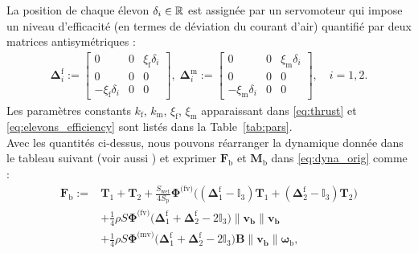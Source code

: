 La position de chaque élevon $\delta_i \in {\mathbb R}$ est assignée par un servomoteur qui impose un niveau d'efficacité (en termes de déviation du courant d'air) quantifié par deux matrices antisymétriques :
\begin{align}
\label{eq:elevons_efficiency}
    \boldsymbol{\Delta}^{\text{f}}_{i} \!:=\! \begin{bmatrix} 0 & 0 & \xi_{\text{f}}\delta_{i} \\ 0 & 0 & 0 \\ -\xi_{\text{f}}\delta_{i} & 0 & 0 \end{bmatrix}\! ,\;
    \boldsymbol{\Delta}^{\text{m}}_{i} \!:=\! \begin{bmatrix} 0 & 0 & \xi_{\text{m}}\delta_{i} \\ 0 & 0 & 0 \\ -\xi_{\text{m}}\delta_{i} & 0 & 0 \end{bmatrix} \!, \quad i=1,2.
\end{align}
 Les paramètres constants $k_{\text{f}}$, $k_{\text{m}}$, $\xi_{\text{f}}$, $\xi_{\text{m}}$ apparaissant dans \eqref{eq:thrust} et \eqref{eq:elevons_efficiency} sont listés dans la Table~\ref{tab:pars}.\\
Avec les quantités ci-dessus, nous pouvons réarranger la dynamique donnée dans le tableau suivant \cite[eqns (97),~(98)]{lustosaHal-03035938} (voir aussi \cite{sansouStage}) et exprimer $\boldsymbol{F}_{\text{b}}$ et $\boldsymbol{M}_{\text{b}}$ dans \eqref{eq:dyna_orig} comme :
%
\begin{align}
\nonumber
    \boldsymbol{F}_{\text{b}} :={}&  \boldsymbol{T}_{1} + \boldsymbol{T}_{2} + \frac{S_{\text{wet}}}{4S_{\text{p}}} \boldsymbol{\Phi}^{\text{(fv)}} \Big( (\boldsymbol{\Delta}^{\text{f}}_1 - \mathbb{I}_{3} ) \boldsymbol{T}_{1} + ( \boldsymbol{\Delta}^{\text{f}}_2 - \mathbb{I}_{3}) \boldsymbol{T}_{2}\Big) \\ 
     \label{eq:Fb}
    &+ \frac{1}{4} \rho S  \boldsymbol{\Phi}^{\text{(fv)}} \Big(\boldsymbol{\Delta}^{\text{f}}_1+ \boldsymbol{\Delta}^{\text{f}}_2 - 2 \mathbb{I}_{3} \Big) \lVert \boldsymbol{v_{\text{b}}} \rVert \boldsymbol{v_{\text{b}}}\\
    \nonumber
    &+ \frac{1}{4} \rho S \boldsymbol{\Phi}^{\text{(mv)}} \Big(\boldsymbol{\Delta}^{\text{f}}_1 + \boldsymbol{\Delta}^{\text{f}}_2 - 2\mathbb{I}_{3}\Big) \boldsymbol{B} \lVert \boldsymbol{v_{\text{b}}} \rVert  \boldsymbol{\omega}_{\text{b}}, 
\end{align}
